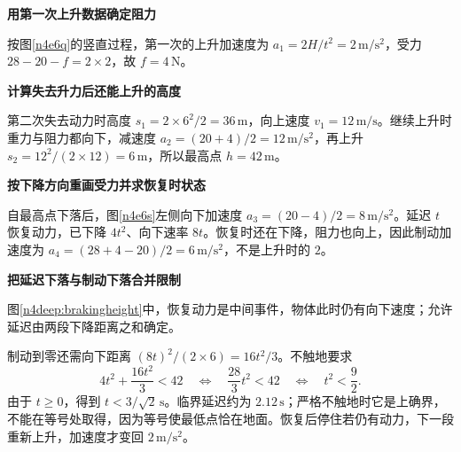 \begin{solution}\textbf{用第一次上升数据确定阻力}\par\nobreak
按图\ref{n4e6q}的竖直过程，第一次的上升加速度为 $a_1=2H/t^2=2\,\mathrm{m/s^2}$，受力 $28-20-f=2\times2$，故 $f=4\,\mathrm N$。

\par\medskip{}\noindent\textbf{计算失去升力后还能上升的高度}\par\nobreak
第二次失去动力时高度 $s_1=2\times6^2/2=36\,\mathrm m$，向上速度 $v_1=12\,\mathrm{m/s}$。继续上升时重力与阻力都向下，减速度 $a_2=(20+4)/2=12\,\mathrm{m/s^2}$，再上升 $s_2=12^2/(2\times12)=6\,\mathrm m$，所以最高点 $h=42\,\mathrm m$。



\par\medskip{}\noindent\textbf{按下降方向重画受力并求恢复时状态}\par\nobreak
自最高点下落后，图\ref{n4e6s}左侧向下加速度 $a_3=(20-4)/2=8\,\mathrm{m/s^2}$。延迟 $t$ 恢复动力，已下降 $4t^2$、向下速率 $8t$。恢复时还在下降，阻力也向上，因此制动加速度为 $a_4=(28+4-20)/2=6\,\mathrm{m/s^2}$，不是上升时的 $2$。



\par\medskip{}\noindent\textbf{把延迟下落与制动下落合并限制}\par\nobreak
{}
图\ref{n4deep:brakingheight}中，恢复动力是中间事件，物体此时仍有向下速度；允许延迟由两段下降距离之和确定。

制动到零还需向下距离 $(8t)^2/(2\times6)=16t^2/3$。不触地要求
\[
 4t^2+\frac{16t^2}{3}<42
 \quad\Longleftrightarrow\quad \frac{28}{3}t^2<42
 \quad\Longleftrightarrow\quad t^2<\frac92.
\]
由于 $t\ge0$，得到 $t<3/\sqrt2\,\mathrm s$。临界延迟约为 $2.12\,\mathrm s$；严格不触地时它是上确界，不能在等号处取得，因为等号使最低点恰在地面。恢复后停住若仍有动力，下一段重新上升，加速度才变回 $2\,\mathrm{m/s^2}$。
\end{solution}

